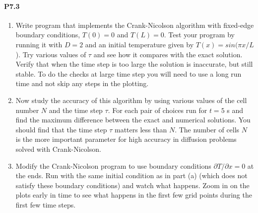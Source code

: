 \paragraph*{P7.3}
\begin{enumerate}[label=(\alph*)]
\item Write program that implements the Crank-Nicolson algorithm with
fixed-edge boundary conditions, $T(0) = 0$ and $T(L) = 0$. Test your
program by running it with $D = 2$ and an initial temperature given
by $T (x) = sin(\pi x/L$). Try various values of $\tau$ and see how it compares
with the exact solution. Verify that when the time step is too large the
solution is inaccurate, but still stable. To do the checks at large time
step you will need to use a long run time and not skip any steps in the
plotting.
\item  Now study the accuracy of this algorithm by using various values of
the cell number $N$ and the time step $\tau$. For each pair of choices run
for $t = 5$ s and find the maximum difference between the exact and
numerical solutions. You should find that the time step $\tau$ matters less
than $N$. The number of cells $N$ is the more important parameter for
high accuracy in diffusion problems solved with Crank-Nicolson.

\item Modify the Crank-Nicolson program to use boundary conditions
$ \partial T /\partial x = 0$ at the ends. Run with the same initial condition as in
part (a) (which does not satisfy these boundary conditions) and watch
what happens. Zoom in on the plots early in time to see what happens
in the first few grid points during the first few time steps.
\end{enumerate}